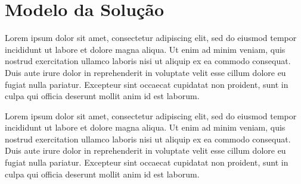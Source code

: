 \section{Modelo da Solução}

	Lorem ipsum dolor sit amet, consectetur adipiscing elit, sed do 
	eiusmod tempor incididunt ut labore et dolore magna aliqua. Ut 
	enim ad minim veniam, quis nostrud exercitation ullamco laboris 
	nisi ut aliquip ex ea commodo consequat. Duis aute irure dolor in 
	reprehenderit in voluptate velit esse cillum dolore eu fugiat 
	nulla pariatur. Excepteur sint occaecat cupidatat non proident, 
	sunt in culpa qui officia deserunt mollit anim id est laborum.

	Lorem ipsum dolor sit amet, consectetur adipiscing elit, sed do 
	eiusmod tempor incididunt ut labore et dolore magna aliqua. Ut 
	enim ad minim veniam, quis nostrud exercitation ullamco laboris 
	nisi ut aliquip ex ea commodo consequat. Duis aute irure dolor in 
	reprehenderit in voluptate velit esse cillum dolore eu fugiat 
	nulla pariatur. Excepteur sint occaecat cupidatat non proident, 
	sunt in culpa qui officia deserunt mollit anim id est laborum.

